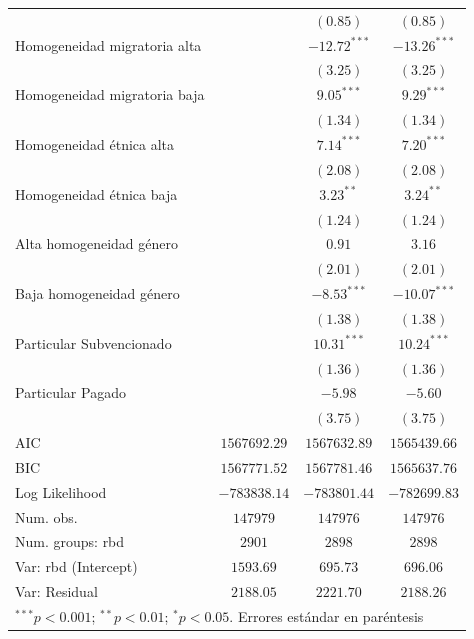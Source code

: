 \documentclass[
]{article}
\begin{document}
\begin{table}
\begin{center}
{\begin{tabular}{l c c c}
                             &                & $(0.85)$       & $(0.85)$       \\
Homogeneidad migratoria alta &                & $-12.72^{***}$ & $-13.26^{***}$ \\
                             &                & $(3.25)$       & $(3.25)$       \\
Homogeneidad migratoria baja &                & $9.05^{***}$   & $9.29^{***}$   \\
                             &                & $(1.34)$       & $(1.34)$       \\
Homogeneidad étnica alta     &                & $7.14^{***}$   & $7.20^{***}$   \\
                             &                & $(2.08)$       & $(2.08)$       \\
Homogeneidad étnica baja     &                & $3.23^{**}$    & $3.24^{**}$    \\
                             &                & $(1.24)$       & $(1.24)$       \\
Alta homogeneidad género     &                & $0.91$         & $3.16$         \\
                             &                & $(2.01)$       & $(2.01)$       \\
Baja homogeneidad género     &                & $-8.53^{***}$  & $-10.07^{***}$ \\
                             &                & $(1.38)$       & $(1.38)$       \\
Particular Subvencionado     &                & $10.31^{***}$  & $10.24^{***}$  \\
                             &                & $(1.36)$       & $(1.36)$       \\
Particular Pagado            &                & $-5.98$        & $-5.60$        \\
                             &                & $(3.75)$       & $(3.75)$       \\
\hline
AIC                          & $1567692.29$   & $1567632.89$   & $1565439.66$   \\
BIC                          & $1567771.52$   & $1567781.46$   & $1565637.76$   \\
Log Likelihood               & $-783838.14$   & $-783801.44$   & $-782699.83$   \\
Num. obs.                    & $147979$       & $147976$       & $147976$       \\
Num. groups: rbd             & $2901$         & $2898$         & $2898$         \\
Var: rbd (Intercept)         & $1593.69$      & $695.73$       & $696.06$       \\
Var: Residual                & $2188.05$      & $2221.70$      & $2188.26$      \\
\hline
\multicolumn{4}{l}{\scriptsize{$^{***}p<0.001$; $^{**}p<0.01$; $^{*}p<0.05$. Errores estándar en paréntesis}}
\end{tabular}
}
\label{table:coefficients}
\end{center}
\end{table}
\end{document}
